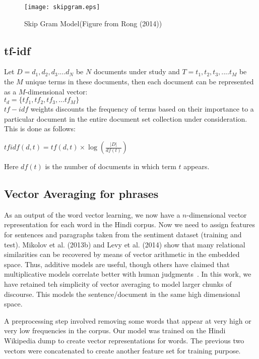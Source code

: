 \begin{figure}[ht!]
\centering
\texttt{[image: skipgram.eps]}
\caption{Skip Gram Model(Figure from Rong (2014)) \label{fig:skipgram}}
\end{figure}

\subsection{tf-idf}
\label{subsec:tfidf}
Let $D=d_1, d_2, d_3....d_N$ be $N$ documents under study and $T=t_1, t_2, t_3,....t_M$ be the $M$ unique terms in these documents, then each document can be represented as a $M$-dimensional vector:\\
$t_d=\{tf_1,tf_2,tf_3,...tf_M\}$\\
$tf-idf$ weights discounts the frequency of terms based on their importance to a particular document in the entire document set collection under consideration. This is done as follows:
\begin{center}
$tfidf(d,t)=tf(d,t) \times \log(\frac{|D|}{df(t)})$ 
\end{center}
Here $df(t)$ is the number of documents in which term $t$ appears.

\subsection{Vector Averaging for phrases}
	\label{sec:vectoraveraging}
As an output of the word vector learning, we now have a $n$-dimensional
vector representation for each word in the Hindi corpus.  Now we need to
assign features for sentences and paragraphs taken from the sentiment dataset
(training and test).  Mikolov et al. (2013b) and Levy et al. (2014) show that
many relational similarities can be recovered by means of vector arithmetic
in the embedded space.  Thus, additive models are useful, though
others have claimed that multiplicative models correlate better with human
judgments~\cite{Mitchell:08,Socher:13}.  In this work, we have retained teh
simplicity of vector averaging to model larger chunks of  discourse.
This models the sentence/document in the same high dimensional space.

A preprocessing step involved removing some words that appear at very high or
very low frequencies in the corpus.  
Our model was trained on the Hindi Wikipedia dump to create vector
representations for words. The previous two vectors were concatenated to
create another feature set for training purpose.  


